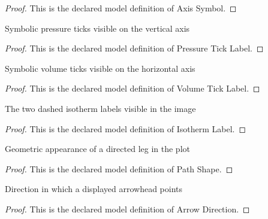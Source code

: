 \begin{proof}
  This is the declared model definition of Axis Symbol.
\end{proof}
\begin{definition}
  \label{def:physics:phyx-mini-0482:phyxminiproblems-problemphyxmini0482-pressureticklabel}
  Symbolic pressure ticks visible on the vertical axis
\end{definition}
\begin{proof}
  This is the declared model definition of Pressure Tick Label.
\end{proof}
\begin{definition}
  \label{def:physics:phyx-mini-0482:phyxminiproblems-problemphyxmini0482-volumeticklabel}
  Symbolic volume ticks visible on the horizontal axis
\end{definition}
\begin{proof}
  This is the declared model definition of Volume Tick Label.
\end{proof}
\begin{definition}
  \label{def:physics:phyx-mini-0482:phyxminiproblems-problemphyxmini0482-isothermlabel}
  The two dashed isotherm labels visible in the image
\end{definition}
\begin{proof}
  This is the declared model definition of Isotherm Label.
\end{proof}
\begin{definition}
  \label{def:physics:phyx-mini-0482:phyxminiproblems-problemphyxmini0482-pathshape}
  Geometric appearance of a directed leg in the plot
\end{definition}
\begin{proof}
  This is the declared model definition of Path Shape.
\end{proof}
\begin{definition}
  \label{def:physics:phyx-mini-0482:phyxminiproblems-problemphyxmini0482-arrowdirection}
  Direction in which a displayed arrowhead points
\end{definition}
\begin{proof}
  This is the declared model definition of Arrow Direction.
\end{proof}
